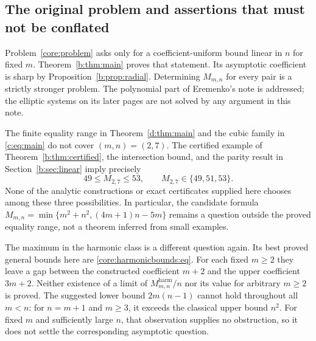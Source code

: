 \documentclass[UTF8,11pt]{ctexart}
\theoremstyle{definition}
\numberwithin{equation}{section}
\begin{document}
\subsection{The original problem and assertions that must not be conflated}
Problem~\ref{core:problem} asks only for a coefficient-uniform bound linear in
$n$ for fixed $m$. Theorem~\ref{b:thm:main} proves that statement. Its
asymptotic coefficient is sharp by Proposition~\ref{b:prop:radial}.
Determining $M_{m,n}$ for every pair is a strictly stronger problem.
The polynomial part of Eremenko's note is addressed; the elliptic systems
on its later pages are not solved by any argument in this note.

The finite equality range in Theorem~\ref{d:thm:main} and the cubic family
in \eqref{c:eq:main} do not cover $(m,n)=(2,7)$. The certified example of
Theorem~\ref{b:thm:certified}, the intersection bound, and the parity result
in Section~\ref{b:sec:linear} imply precisely
\[
 49\le M_{2,7}\le53,\qquad M_{2,7}\in\{49,51,53\}.
\]
None of the analytic constructions or exact certificates supplied here
chooses among these three possibilities. In particular, the candidate
formula $M_{m,n}=\min\{m^2+n^2,(4m+1)n-5m\}$ remains a question outside
the proved equality range, not a theorem inferred from small examples.

The maximum in the harmonic class is a different question again. Its
best proved general bounds here are \eqref{core:harmonicbounds:eq}.
For each fixed $m\ge2$ they leave a gap between the constructed coefficient
$m+2$ and the upper coefficient $3m+2$. Neither existence of a limit of
$M^{\mathrm{harm}}_{m,n}/n$ nor its value for arbitrary $m\ge2$ is proved.
The suggested lower bound $2m(n-1)$ cannot hold throughout all $m<n$:
for $n=m+1$ and $m\ge3$, it exceeds the classical upper bound $n^2$.
For fixed $m$ and sufficiently large $n$, that observation supplies no
obstruction, so it does not settle the corresponding asymptotic question.
\end{document}
